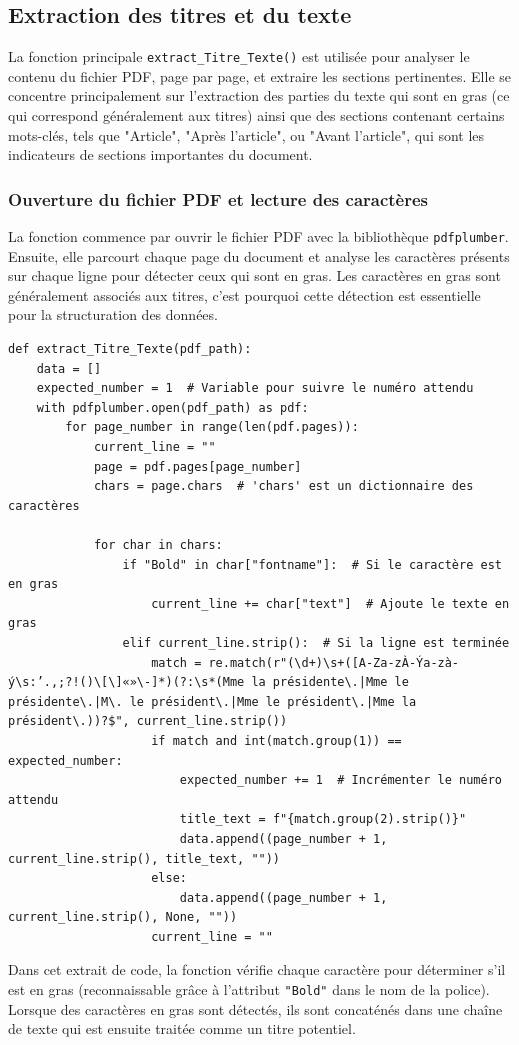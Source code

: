 \subsection{Extraction des titres et du texte}

La fonction principale \texttt{extract\_Titre\_Texte()} est utilisée pour analyser le contenu du fichier \gls{PDF}, page par page, et extraire les sections pertinentes. Elle se concentre principalement sur l'extraction des parties du texte qui sont en gras (ce qui correspond généralement aux titres) ainsi que des sections contenant certains mots-clés, tels que "Article", "Après l’article", ou "Avant l’article", qui sont les indicateurs de sections importantes du document.

\subsubsection{Ouverture du fichier PDF et lecture des caractères}

La fonction commence par ouvrir le fichier \gls{PDF} avec la bibliothèque \texttt{pdfplumber}. Ensuite, elle parcourt chaque page du document et analyse les caractères présents sur chaque ligne pour détecter ceux qui sont en gras. Les caractères en gras sont généralement associés aux titres, c'est pourquoi cette détection est essentielle pour la structuration des données.
\begin{lstlisting}
def extract_Titre_Texte(pdf_path):
    data = []
    expected_number = 1  # Variable pour suivre le numéro attendu
    with pdfplumber.open(pdf_path) as pdf:
        for page_number in range(len(pdf.pages)):
            current_line = ""
            page = pdf.pages[page_number]
            chars = page.chars  # 'chars' est un dictionnaire des caractères

            for char in chars:
                if "Bold" in char["fontname"]:  # Si le caractère est en gras
                    current_line += char["text"]  # Ajoute le texte en gras
                elif current_line.strip():  # Si la ligne est terminée
                    match = re.match(r"(\d+)\s+([A-Za-zÀ-Ýa-zà-ý\s:’.,;?!()\[\]«»\-]*)(?:\s*(Mme la présidente\.|Mme le présidente\.|M\. le président\.|Mme le président\.|Mme la président\.))?$", current_line.strip())
                    if match and int(match.group(1)) == expected_number:
                        expected_number += 1  # Incrémenter le numéro attendu
                        title_text = f"{match.group(2).strip()}"
                        data.append((page_number + 1, current_line.strip(), title_text, ""))
                    else:
                        data.append((page_number + 1, current_line.strip(), None, ""))
                    current_line = ""
\end{lstlisting}
Dans cet extrait de code, la fonction vérifie chaque caractère pour déterminer s'il est en gras (reconnaissable grâce à l'attribut \texttt{"Bold"} dans le nom de la police). Lorsque des caractères en gras sont détectés, ils sont concaténés dans une chaîne de texte qui est ensuite traitée comme un titre potentiel.


